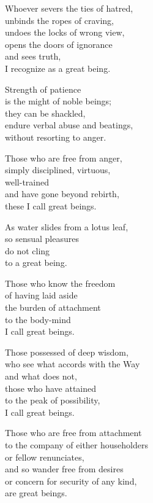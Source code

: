 Whoever severs the ties of hatred,\\
unbinds the ropes of craving,\\
undoes the locks of wrong view,\\
opens the doors of ignorance\\
and sees truth,\\
I recognize as a great being.


Strength of patience\\
is the might of noble beings;\\
they can be shackled,\\
endure verbal abuse and beatings,\\
without resorting to anger.


Those who are free from anger,\\
simply disciplined, virtuous,\\
well-trained\\
and have gone beyond rebirth,\\
these I call great beings.


As water slides from a lotus leaf,\\
so sensual pleasures\\
do not cling\\
to a great being.


Those who know the freedom\\
of having laid aside\\
the burden of attachment\\
to the body-mind\\
I call great beings.


Those possessed of deep wisdom,\\
who see what accords with the Way\\
and what does not,\\
those who have attained\\
to the peak of possibility,\\
I call great beings.


Those who are free from attachment\\
to the company of either householders\\
or fellow renunciates,\\
and so wander free from desires\\
or concern for security of any kind,\\
are great beings.


